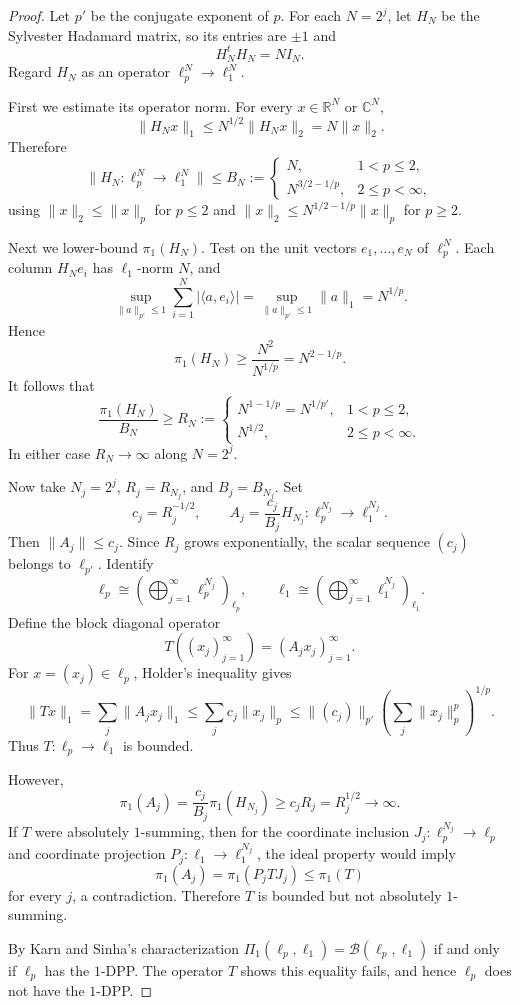 \documentclass[11pt]{article}
\newcommand{\B}{\mathcal B}
\newcommand{\piOne}{\pi_1}
\begin{document}
\begin{proof}
Let \(p'\) be the conjugate exponent of \(p\).  For each \(N=2^j\), let
\(H_N\) be the Sylvester Hadamard matrix, so its entries are \(\pm 1\) and
\[
  H_N^tH_N=NI_N.
\]
Regard \(H_N\) as an operator \(\ell_p^N\to\ell_1^N\).

First we estimate its operator norm.  For every \(x\in\mathbb R^N\) or
\(\mathbb C^N\),
\[
  \|H_Nx\|_1
  \le N^{1/2}\|H_Nx\|_2
  = N\|x\|_2.
\]
Therefore
\[
  \|H_N:\ell_p^N\to\ell_1^N\|
  \le B_N :=
  \begin{cases}
    N, & 1<p\le 2,\\
    N^{3/2-1/p}, & 2\le p<\infty,
  \end{cases}
\]
using \(\|x\|_2\le \|x\|_p\) for \(p\le2\) and
\(\|x\|_2\le N^{1/2-1/p}\|x\|_p\) for \(p\ge2\).

Next we lower-bound \(\piOne(H_N)\).  Test on the unit vectors
\(e_1,\ldots,e_N\) of \(\ell_p^N\).  Each column \(H_Ne_i\) has
\(\ell_1\)-norm \(N\), and
\[
  \sup_{\|a\|_{p'}\le1}\sum_{i=1}^N |\langle a,e_i\rangle|
  = \sup_{\|a\|_{p'}\le1}\|a\|_1
  = N^{1/p}.
\]
Hence
\[
  \piOne(H_N)\ge \frac{N^2}{N^{1/p}}=N^{2-1/p}.
\]
It follows that
\[
  \frac{\piOne(H_N)}{B_N}\ge R_N :=
  \begin{cases}
    N^{1-1/p}=N^{1/p'}, & 1<p\le2,\\
    N^{1/2}, & 2\le p<\infty.
  \end{cases}
\]
In either case \(R_N\to\infty\) along \(N=2^j\).

Now take \(N_j=2^j\), \(R_j=R_{N_j}\), and \(B_j=B_{N_j}\).  Set
\[
  c_j=R_j^{-1/2},\qquad A_j=\frac{c_j}{B_j}H_{N_j}:
  \ell_p^{N_j}\to\ell_1^{N_j}.
\]
Then \(\|A_j\|\le c_j\).  Since \(R_j\) grows exponentially, the scalar
sequence \((c_j)\) belongs to \(\ell_{p'}\).  Identify
\[
  \ell_p \cong \left(\bigoplus_{j=1}^\infty \ell_p^{N_j}\right)_{\ell_p},
  \qquad
  \ell_1 \cong \left(\bigoplus_{j=1}^\infty \ell_1^{N_j}\right)_{\ell_1}.
\]
Define the block diagonal operator
\[
  T((x_j)_{j=1}^\infty)=(A_jx_j)_{j=1}^\infty.
\]
For \(x=(x_j)\in\ell_p\), Holder's inequality gives
\[
  \|Tx\|_1
  =\sum_j \|A_jx_j\|_1
  \le \sum_j c_j\|x_j\|_p
  \le \|(c_j)\|_{p'} \left(\sum_j \|x_j\|_p^p\right)^{1/p}.
\]
Thus \(T:\ell_p\to\ell_1\) is bounded.

However,
\[
  \piOne(A_j)
  =\frac{c_j}{B_j}\piOne(H_{N_j})
  \ge c_jR_j
  =R_j^{1/2}\longrightarrow\infty.
\]
If \(T\) were absolutely \(1\)-summing, then for the coordinate inclusion
\(J_j:\ell_p^{N_j}\to\ell_p\) and coordinate projection
\(P_j:\ell_1\to\ell_1^{N_j}\), the ideal property would imply
\[
  \piOne(A_j)=\piOne(P_jTJ_j)\le \piOne(T)
\]
for every \(j\), a contradiction.  Therefore \(T\) is bounded but not
absolutely \(1\)-summing.

By Karn and Sinha's characterization
\(\Pi_1(\ell_p,\ell_1)=\B(\ell_p,\ell_1)\) if and only if \(\ell_p\) has the
\(1\)-DPP.  The operator \(T\) shows this equality fails, and hence
\(\ell_p\) does not have the \(1\)-DPP.
\end{proof}
\end{document}
